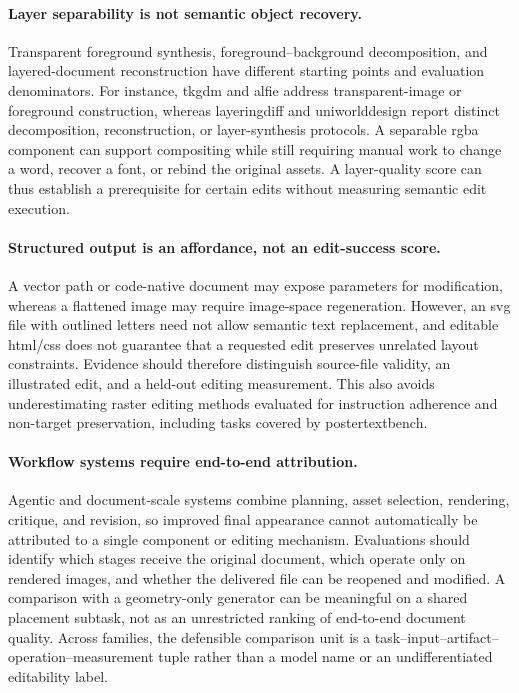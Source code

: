 \paragraph{Layer separability is not semantic object recovery.}
Transparent foreground synthesis, foreground--background decomposition, and layered-document reconstruction have different starting points and evaluation denominators.
For instance, \ac{tkgdm} and \ac{alfie} address transparent-image or foreground construction, whereas \ac{layeringdiff} and \ac{uniworlddesign} report distinct decomposition, reconstruction, or layer-synthesis protocols.
A separable \ac{rgba} component can support compositing while still requiring manual work to change a word, recover a font, or rebind the original assets.
A layer-quality score can thus establish a prerequisite for certain edits without measuring semantic edit execution.

\paragraph{Structured output is an affordance, not an edit-success score.}
A vector path or code-native document may expose parameters for modification, whereas a flattened image may require image-space regeneration.
However, an \ac{svg} file with outlined letters need not allow semantic text replacement, and editable \ac{html}/\ac{css} does not guarantee that a requested edit preserves unrelated layout constraints.
Evidence should therefore distinguish source-file validity, an illustrated edit, and a held-out editing measurement.
This also avoids underestimating raster editing methods evaluated for instruction adherence and non-target preservation, including tasks covered by \ac{postertextbench}.

\paragraph{Workflow systems require end-to-end attribution.}
Agentic and document-scale systems combine planning, asset selection, rendering, critique, and revision, so improved final appearance cannot automatically be attributed to a single component or editing mechanism.
Evaluations should identify which stages receive the original document, which operate only on rendered images, and whether the delivered file can be reopened and modified.
A comparison with a geometry-only generator can be meaningful on a shared placement subtask, not as an unrestricted ranking of end-to-end document quality.
Across families, the defensible comparison unit is a task--input--artifact--operation--measurement tuple rather than a model name or an undifferentiated editability label.

